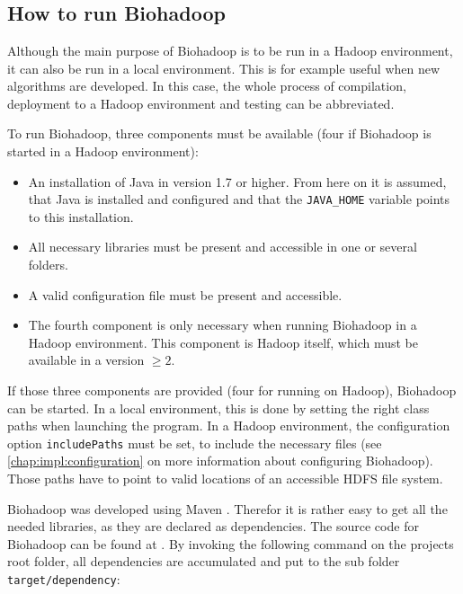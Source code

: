 \appendix
\addappheadtotoc

\chapter{}

\section{How to run Biohadoop}
\label{chap:usage:run}
Although the main purpose of Biohadoop is to be run in a Hadoop environment, it can also be run in a local environment. This is for example useful when new algorithms are developed. In this case, the whole process of compilation, deployment to a Hadoop environment and testing can be abbreviated.

To run Biohadoop, three components must be available (four if Biohadoop is started in a Hadoop environment):

\begin{itemize}
  \item An installation of Java in version 1.7 or higher. From here on it is assumed, that Java is installed and configured and that the \texttt{JAVA\_HOME} variable points to this installation.
  \item All necessary libraries must be present and accessible in one or several folders.
  \item A valid configuration file must be present and accessible.
  \item The fourth component is only necessary when running Biohadoop in a Hadoop environment. This component is Hadoop itself, which must be available in a version $\geq 2$.
\end{itemize}

If those three components are provided (four for running on Hadoop), Biohadoop can be started. In a local environment, this is done by setting the right class paths when launching the program. In a Hadoop environment, the configuration option \texttt{includePaths} must be set, to include the necessary files (see \ref{chap:impl:configuration} on more information about configuring Biohadoop). Those paths have to point to valid locations of an accessible HDFS file system.

Biohadoop was developed using Maven \cite{maven}. Therefor it is rather easy to get all the needed libraries, as they are declared as dependencies. The source code for Biohadoop can be found at \cite{biohadoop}. By invoking the following command on the projects root folder, all dependencies are accumulated and put to the sub folder \texttt{target/dependency}:

